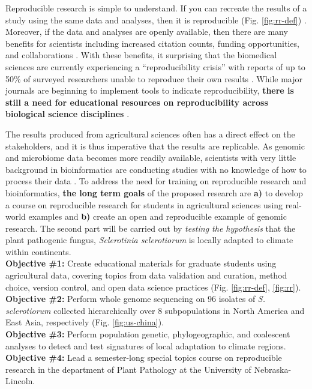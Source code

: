 \documentclass[12pt,letterpaper]{article}
\begin{document}
Reproducible research is simple to understand. 
If you can recreate the results of a study using the same data and analyses, then it is reproducible (Fig. \ref{fig:rr-def}) \citep{buckheit1995wavelab,peng2011reproducible,patil2016statistical}. 
Moreover, if the data and analyses are openly available, then there  are many benefits for scientists including increased citation counts, funding opportunities, and collaborations \citep{mckiernan2016open,stewart-lowndes2017path,schmidt2016stepping}.
With these benefits, it surprising that the biomedical sciences are currently experiencing a ``reproducibility crisis'' with reports of up to 50\% of surveyed researchers unable to reproduce their own results \citep{baker2016scientists}.
While major journals are beginning to implement tools to indicate reproducibility, \textbf{there is still a need for educational resources on reproducibility across biological science disciplines} \citep{nature2017announcement, barone2017unmet}.

The results produced from agricultural sciences often has a direct effect on the stakeholders, and it is thus imperative that the results are replicable. 
As genomic and microbiome data becomes more readily available, scientists with very little background in bioinformatics are conducting studies with no knowledge of how to process their data \citep{stewart-lowndes2017path, barone2017unmet}. 
To address the need for training on reproducible research and bioinformatics, \textbf{the long term goals} of the proposed research are \textbf{a)} to develop a course on reproducible research for students in agricultural sciences using real-world examples and \textbf{b)} create an open and reproducible example of genomic research. The second part will be carried out by \textit{testing the hypothesis} that the plant pathogenic fungus, \textit{Sclerotinia sclerotiorum} is locally adapted to climate within continents.\\
\textbf{Objective \#1:} Create educational materials for graduate students using agricultural data, covering topics from data validation and curation, method choice, version control, and open data science practices (Fig. \ref{fig:rr-def}, \ref{fig:rr}).\\
\textbf{Objective \#2:} Perform whole genome sequencing on 96 isolates of \textit{S. sclerotiorum} collected hierarchically over 8 subpopulations in North America and East Asia, respectively (Fig. \ref{fig:us-china}).\\
\textbf{Objective \#3:} Perform population genetic, phylogeographic, and coalescent analyses to detect and test signatures of local adaptation to climate regions.\\
\textbf{Objective \#4:} Lead a semester-long special topics course on reproducible research in the department of Plant Pathology at the University of Nebraska-Lincoln.
\end{document}
